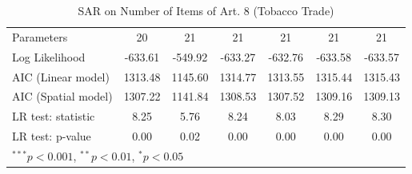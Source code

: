 \begin{table}[!h]
\begin{center}
\begin{tabular}{l c c c c c c }
Parameters              & 20           & 21           & 21           & 21           & 21           & 21           \\
Log Likelihood          & -633.61      & -549.92      & -633.27      & -632.76      & -633.58      & -633.57      \\
AIC (Linear model)      & 1313.48      & 1145.60      & 1314.77      & 1313.55      & 1315.44      & 1315.43      \\
AIC (Spatial model)     & 1307.22      & 1141.84      & 1308.53      & 1307.52      & 1309.16      & 1309.13      \\
LR test: statistic      & 8.25         & 5.76         & 8.24         & 8.03         & 8.29         & 8.30         \\
LR test: p-value        & 0.00         & 0.02         & 0.00         & 0.00         & 0.00         & 0.00         \\
\bottomrule
\multicolumn{7}{l}{\scriptsize{$^{***}p<0.001$, $^{**}p<0.01$, $^*p<0.05$}}
\end{tabular}
\caption{SAR on Number of Items of Art. 8 (Tobacco Trade)}
\label{table:coefficients}
\end{center}
\end{table}
